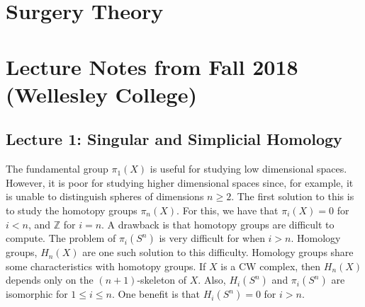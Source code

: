 \documentclass[crop=false,class=article,oneside]{standalone}
\begin{document}
    \ifx\ifmathcoursessurgery\undefined
        \section*{Surgery Theory}
        \setcounter{section}{2}
        \renewcommand\thefigure{\arabic{section}.\arabic{figure}}
        \renewcommand\thesubfigure{%
            \arabic{section}.\arabic{figure}.\arabic{subfigure}}
    \else
        \section{Lecture Notes from Fall 2018 (Wellesley College)}
    \fi
    \subsection{Lecture 1: Singular and Simplicial Homology}
        The fundamental group $\pi_{1}(X)$ is useful for
        studying low dimensional spaces. However, it is poor for
        studying higher dimensional spaces since, for example,
        it is unable to distinguish spheres of dimensions
        $n\geq 2$. The first solution to this is to study
        the homotopy groups $\pi_{n}(X)$. For this, we have
        that $\pi_{i}(X)=0$ for $i<n$, and $\mathbb{Z}$ for
        $i=n$. A drawback is that homotopy groups are
        difficult to compute. The problem of $\pi_{i}(S^{n})$
        is very difficult for when $i>n$. Homology groups,
        $H_{n}(X)$ are one such solution to this difficulty.
        Homology groups share some characteristics with
        homotopy groups. If $X$ is a CW complex, then $H_{n}(X)$
        depends only on the $(n+1)$-skeleton of $X$. Also,
        $H_{i}(S^{n})$ and $\pi_{i}(S^{n})$ are isomorphic for
        $1\leq i\leq n$. One benefit is that $H_{i}(S^{n})=0$
        for $i>n$.
\end{document}
